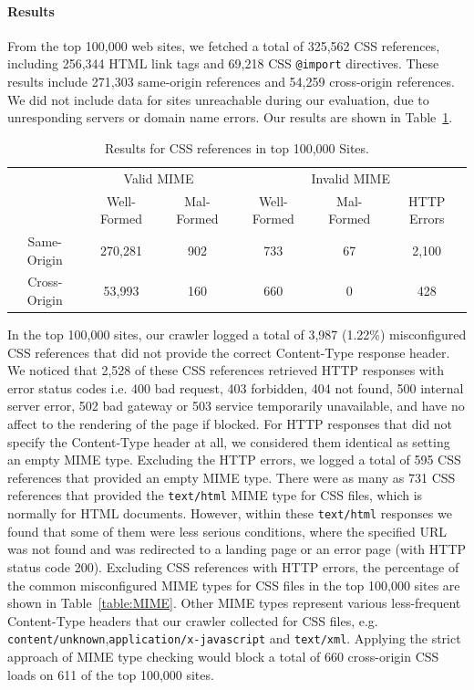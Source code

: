 \documentclass{acm_proc_article-sp}
\begin{document}
\paragraph{Results}
From the top 100,000 web sites, we fetched a total of 325,562 CSS references, including 256,344 HTML link tags and 69,218 CSS \texttt{@import} directives. These results include 271,303 same-origin references and 54,259 cross-origin references. We did not include data for sites unreachable during our evaluation, due to unresponding servers or domain name errors. Our results are shown in Table~\ref{table:results}.

\begin{table}
\centering
\begin{tabular}{|c|c|c|c|c|c|} \hline
&\multicolumn{2}{|c}{Valid MIME}&\multicolumn{3}{|c|}{Invalid MIME}\\ %
\cline{2-6}
&Well-Formed&Mal-Formed&Well-Formed&Mal-Formed&HTTP Errors\\ \hline
Same-Origin&270,281&902&733&67&2,100\\ \hline
Cross-Origin&53,993&160&660&0&428\\
\hline\end{tabular}
\caption{Results for CSS references in top 100,000 Sites.}
\label{table:results}
\end{table}

In the top 100,000 sites, our crawler logged a total of 3,987 (1.22\%) misconfigured CSS references that did not provide the correct Content-Type response header. We noticed that 2,528 of these CSS references retrieved HTTP responses with error status codes i.e. 400 bad request, 403 forbidden, 404 not found, 500 internal server error, 502 bad gateway or 503 service temporarily unavailable, and have no affect to the rendering of the page if blocked. For HTTP responses that did not specify the Content-Type header at all, we considered them identical as setting an empty MIME type. Excluding the HTTP errors, we logged a total of 595 CSS references that provided an empty MIME type. There were as many as 731 CSS references that provided the \verb|text/html| MIME type for CSS files, which is normally for HTML documents. However, within these \texttt{text/html} responses we found that some of them were less serious conditions, where the specified URL was not found and was redirected to a landing page or an error page (with HTTP status code 200). Excluding CSS references with HTTP errors, the percentage of the common misconfigured MIME types for CSS files in the top 100,000 sites are shown in Table~\ref{table:MIME}. Other MIME types represent various less-frequent Content-Type headers that our crawler collected for CSS files, e.g. \verb|content/unknown|,\verb|application/x-javascript| and \verb|text/xml|. Applying the strict approach of MIME type checking would block a total of 660 cross-origin CSS loads on 611 of the top 100,000 sites.
\end{document}
